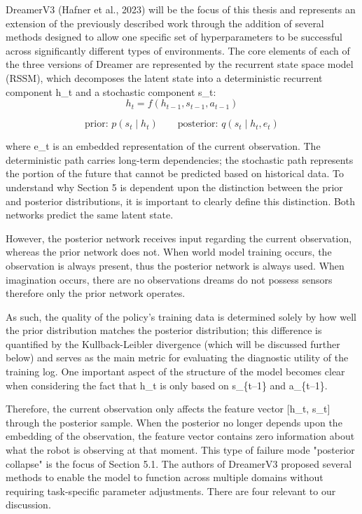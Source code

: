 \documentclass[12pt,a4paper,oneside]{report}
\begin{document}
DreamerV3 (Hafner et al., 2023) will be the focus of this thesis and represents an extension of the previously described work through the addition of several methods designed to allow one specific set of hyperparameters to be successful across significantly different types of environments. The core elements of each of the three versions of Dreamer are represented by the recurrent state space model (RSSM), which decomposes the latent state into a deterministic recurrent component h\_t and a stochastic component s\_t: 
\begin{equation*}
h_t = f\!\left(h_{t-1}, s_{t-1}, a_{t-1}\right)
\end{equation*}

\begin{equation*}
\text{prior: } p(s_t \mid h_t) \qquad \text{posterior: } q(s_t \mid h_t, e_t)
\end{equation*}

where e\_t is an embedded representation of the current observation. The deterministic path carries long-term dependencies; the stochastic path represents the portion of the future that cannot be predicted based on historical data. To understand why Section 5 is dependent upon the distinction between the prior and posterior distributions, it is important to clearly define this distinction. Both networks predict the same latent state.

However, the posterior network receives input regarding the current observation, whereas the prior network does not. When world model training occurs, the observation is always present, thus the posterior network is always used. When imagination occurs, there are no observations dreams do not possess sensors therefore only the prior network operates.

As such, the quality of the policy's training data is determined solely by how well the prior distribution matches the posterior distribution; this difference is quantified by the Kullback-Leibler divergence (which will be discussed further below) and serves as the main metric for evaluating the diagnostic utility of the training log. One important aspect of the structure of the model becomes clear when considering the fact that h\_t is only based on s\_\{t--1\} and a\_\{t--1\}.

Therefore, the current observation only affects the feature vector {[}h\_t, s\_t{]} through the posterior sample. When the posterior no longer depends upon the embedding of the observation, the feature vector contains zero information about what the robot is observing at that moment. This type of failure mode  "posterior collapse" is the focus of Section 5.1. The authors of DreamerV3 proposed several methods to enable the model to function across multiple domains without requiring task-specific parameter adjustments. There are four relevant to our discussion.
\end{document}
